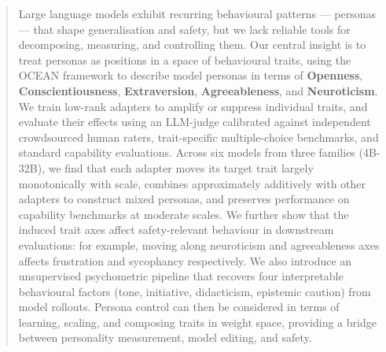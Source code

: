 \begin{abstract}
Large language models exhibit recurring behavioural patterns --- personas --- that shape generalisation and safety, but we lack reliable tools for decomposing, measuring, and controlling them. Our central insight is to treat personas as positions in a space of behavioural traits, using the OCEAN framework to describe model personas in terms of \textbf{Openness}, \textbf{Conscientiousness}, \textbf{Extraversion}, \textbf{Agreeableness}, and \textbf{Neuroticism}. We train low-rank adapters to amplify or suppress individual traits, and evaluate their effects using an LLM-judge calibrated against independent crowdsourced human raters, trait-specific multiple-choice benchmarks, and standard capability evaluations. Across six models from three families (4B-32B), we find that each adapter moves its target trait largely monotonically with scale, combines approximately additively with other adapters to construct mixed personas, and preserves performance on capability benchmarks at moderate scales. We further show that the induced trait axes affect safety-relevant behaviour in downstream evaluations: for example, moving along neuroticism and agreeableness axes affects frustration and sycophancy respectively. We also introduce an unsupervised psychometric pipeline that recovers four interpretable behavioural factors (tone, initiative, didacticism, epistemic caution) from model rollouts. Persona control can then be considered in terms of learning, scaling, and composing traits in weight space, providing a bridge between personality measurement, model editing, and safety.
\end{abstract}
